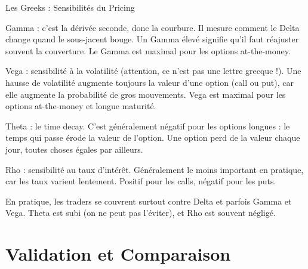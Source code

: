 \documentclass[aspectratio=169, 10pt]{beamer}
\begin{document}
\begin{frame}{Les Greeks : Sensibilités du Pricing}
{        Gamma : c'est la dérivée seconde, donc la courbure.
        Il mesure comment le Delta change quand le sous-jacent bouge.
        Un Gamma élevé signifie qu'il faut réajuster souvent la couverture.
        Le Gamma est maximal pour les options at-the-money.
        
        Vega : sensibilité à la volatilité (attention, ce n'est pas une lettre grecque !).
        Une hausse de volatilité augmente toujours la valeur d'une option
        (call ou put), car elle augmente la probabilité de gros mouvements.
        Vega est maximal pour les options at-the-money et longue maturité.
        
        Theta : le time decay. C'est généralement négatif pour les options longues :
        le temps qui passe érode la valeur de l'option.
        Une option perd de la valeur chaque jour, toutes choses égales par ailleurs.
        
        Rho : sensibilité au taux d'intérêt. Généralement le moins important en pratique,
        car les taux varient lentement. Positif pour les calls, négatif pour les puts.
        
        En pratique, les traders se couvrent surtout contre Delta et parfois Gamma et Vega.
        Theta est subi (on ne peut pas l'éviter), et Rho est souvent négligé.
    }
\end{frame}

\section{Validation et Comparaison}
\end{document}
